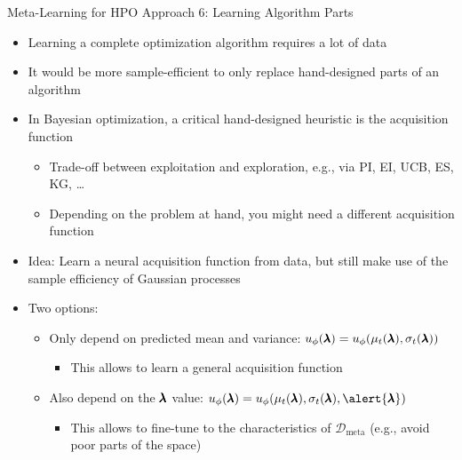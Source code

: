 \begin{frame}[c]{Meta-Learning for HPO Approach 6: Learning Algorithm Parts}

\begin{itemize}
	\item Learning a complete optimization algorithm  \alert{requires a lot of data}
	\item It would be more \alert{sample-efficient} to \alert{only replace hand-designed parts} of an algorithm

\bigskip
\pause
	\item In Bayesian optimization, a critical hand-designed heuristic is the acquisition function
	\begin{itemize}
		\item Trade-off between exploitation and exploration, e.g., via PI, EI, UCB, ES, KG, \dots 
		\item Depending on the problem at hand, you might need a different acquisition function
	\end{itemize}
\pause
\smallskip

    \item \alert{Idea:} Learn a \alert{neural acquisition function} from data, but still make use of the sample efficiency of Gaussian processes 

\pause
\medskip
    \item Two options:
    \begin{itemize}
        \item Only depend on predicted mean and variance: $u_\phi(\pmb{\lambda}) = u_\phi(\mu_t(\pmb{\lambda}), \sigma_t(\pmb{\lambda}))$ 
        \begin{itemize}
            \item This allows to learn a general acquisition function
        \end{itemize}
\pause
        \item Also depend on the $\pmb{\lambda}$ value: $\acq_\phi(\conf) = \acq_\phi(\mu_t(\conf), \sigma_t(\conf), \alert{\conf})$  
        \begin{itemize}
            \item This allows to fine-tune to the characteristics of $\mathcal{D}_{\text{meta}}$ (e.g., avoid poor parts of the space) 
        \end{itemize}
    \end{itemize}

\end{itemize}


\end{frame}

